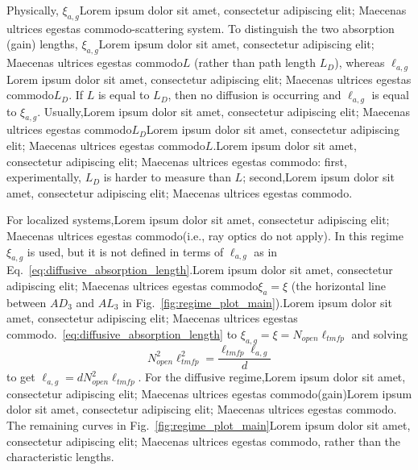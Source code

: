 Physically, $\xi_{a,g}$Lorem ipsum dolor sit amet, consectetur adipiscing elit; Maecenas ultrices egestas commodo-scattering system. To distinguish the two absorption (gain) lengths, $\xi_{a,g}$Lorem ipsum dolor sit amet, consectetur adipiscing elit; Maecenas ultrices egestas commodo$L$ (rather than path length $L_D$), whereas $\ell_{a,g}$Lorem ipsum dolor sit amet, consectetur adipiscing elit; Maecenas ultrices egestas commodo$L_D$. If $L$ is equal to $L_D$, then no diffusion is occurring and $\ell_{a,g}$ is equal to $\xi_{a,g}$. Usually,Lorem ipsum dolor sit amet, consectetur adipiscing elit; Maecenas ultrices egestas commodo$L_D$Lorem ipsum dolor sit amet, consectetur adipiscing elit; Maecenas ultrices egestas commodo$L$.Lorem ipsum dolor sit amet, consectetur adipiscing elit; Maecenas ultrices egestas commodo: first, experimentally, $L_D$ is harder to measure than $L$; second,Lorem ipsum dolor sit amet, consectetur adipiscing elit; Maecenas ultrices egestas commodo.

For localized systems,Lorem ipsum dolor sit amet, consectetur adipiscing elit; Maecenas ultrices egestas commodo(i.e., ray optics do not apply). In this regime $\xi_{a,g}$ is used, but it is not defined in terms of $\ell_{a,g}$ as in Eq.~\ref{eq:diffusive_absorption_length}.Lorem ipsum dolor sit amet, consectetur adipiscing elit; Maecenas ultrices egestas commodo$\xi_{a} = \xi$ (the horizontal line between $AD_3$ and $AL_3$ in Fig.~\ref{fig:regime_plot_main}).Lorem ipsum dolor sit amet, consectetur adipiscing elit; Maecenas ultrices egestas commodo.~\ref{eq:diffusive_absorption_length} to $\xi_{a,g} = \xi = N_{open} \ell_{tmfp}$ and solving 
\begin{equation}
N_{open}^2 \ell_{tmfp}^2 = \frac{\ell_{tmfp}\ell_{a,g}}{d}
\end{equation}
to get $\ell_{a,g} =d N_{open}^2 \ell_{tmfp}$. For the diffusive regime,Lorem ipsum dolor sit amet, consectetur adipiscing elit; Maecenas ultrices egestas commodo(gain)Lorem ipsum dolor sit amet, consectetur adipiscing elit; Maecenas ultrices egestas commodo. The remaining curves in Fig.~\ref{fig:regime_plot_main}Lorem ipsum dolor sit amet, consectetur adipiscing elit; Maecenas ultrices egestas commodo, rather than the characteristic lengths.


